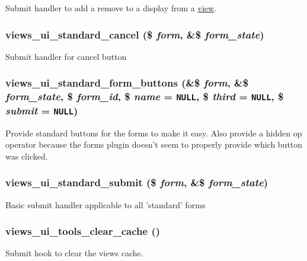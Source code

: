 Submit handler to add a remove to a display from a \hyperlink{classview}{view}. \hypertarget{admin_8inc_69c20e73b4a54447f15797c44bdb8344}{
\subsubsection[{views\_\-ui\_\-standard\_\-cancel}]{\setlength{\rightskip}{0pt plus 5cm}views\_\-ui\_\-standard\_\-cancel (\$ {\em form}, \/  \&\$ {\em form\_\-state})}}
\label{admin_8inc_69c20e73b4a54447f15797c44bdb8344}


Submit handler for cancel button \hypertarget{admin_8inc_14c82c16cedbaecf8fb20e1aabc1a15b}{
\subsubsection[{views\_\-ui\_\-standard\_\-form\_\-buttons}]{\setlength{\rightskip}{0pt plus 5cm}views\_\-ui\_\-standard\_\-form\_\-buttons (\&\$ {\em form}, \/  \&\$ {\em form\_\-state}, \/  \$ {\em form\_\-id}, \/  \$ {\em name} = {\tt NULL}, \/  \$ {\em third} = {\tt NULL}, \/  \$ {\em submit} = {\tt NULL})}}
\label{admin_8inc_14c82c16cedbaecf8fb20e1aabc1a15b}


Provide standard buttons for the forms to make it easy. Also provide a hidden op operator because the forms plugin doesn't seem to properly provide which button was clicked. \hypertarget{admin_8inc_9af5bfc6978dc754bdfe126ac758deda}{
\subsubsection[{views\_\-ui\_\-standard\_\-submit}]{\setlength{\rightskip}{0pt plus 5cm}views\_\-ui\_\-standard\_\-submit (\$ {\em form}, \/  \&\$ {\em form\_\-state})}}
\label{admin_8inc_9af5bfc6978dc754bdfe126ac758deda}


Basic submit handler applicable to all 'standard' forms \hypertarget{admin_8inc_20d738f2a5405c5fbbdbd82954bbf050}{
\subsubsection[{views\_\-ui\_\-tools\_\-clear\_\-cache}]{\setlength{\rightskip}{0pt plus 5cm}views\_\-ui\_\-tools\_\-clear\_\-cache ()}}
\label{admin_8inc_20d738f2a5405c5fbbdbd82954bbf050}


Submit hook to clear the views cache. 